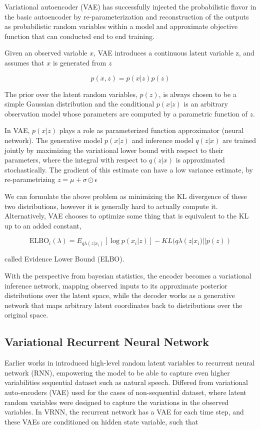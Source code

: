 \documentclass{article}
\begin{document}
Variational autoencoder (VAE) \cite{vae} has successfully injected the probabilistic flavor in the basic autoencoder by re-parameterization and reconstruction of the outputs as probabilistic random variables within a model and approximate objective function that can conducted end to end training.

Given an observed variable $x$, VAE introduces a continuous latent variable z, and assumes that $x$ is generated from $z$

$$p(x,z) = p(x|z)p(z)$$

The prior over the latent random variables, $p(z)$, is always chosen to be a simple Gaussian distribution and the conditional $p(x|z)$ is an arbitrary observation model whose parameters are computed by a parametric function of $z$. 

In VAE, $p(x|z)$ plays a role as parameterized function approximator (neural network). The generative model $p(x|z)$ and inference model $q(z|x)$ are trained jointly by maximizing the variational lower bound with respect to their parameters, where the integral with respect to $q(z|x)$ is approximated stochastically. The gradient of this estimate can have a low variance estimate, by re-parametrizing $z = \mu+\sigma\odot\epsilon$

We can formulate the above problem as minimizing the KL divergence of these two distributions, however it is generally hard to actually compute it. Alternatively, VAE chooses to optimize some thing that is equivalent to the KL up to an added constant,

$$\text{ELBO}_i (\lambda) = E_{q\lambda (z|x_i)}[\log p(x_i|z)]-KL(q\lambda (z|x_i)||p(z))$$ 

called Evidence Lower Bound (ELBO).

With the perspective from bayesian statistics, the encoder becomes a variational inference network, mapping observed inputs to its approximate posterior distributions over the latent space, while the decoder works as a generative network that maps arbitrary latent coordinates back to distributions over the original space.


\subsection{Variational Recurrent Neural Network}
Earlier works in \cite{vrnn} introduced high-level random latent variables to recurrent neural network (RNN), empowering the model to be able to capture even higher variabilities sequential dataset such as natural speech. Differed from variational auto-encoders (VAE) used for the cases of non-sequential dataset, where latent random variables were designed to capture the variations in the observed variables. In VRNN, the recurrent network has a VAE for each time step, and these VAEs are conditioned on hidden state variable, such that
\end{document}
